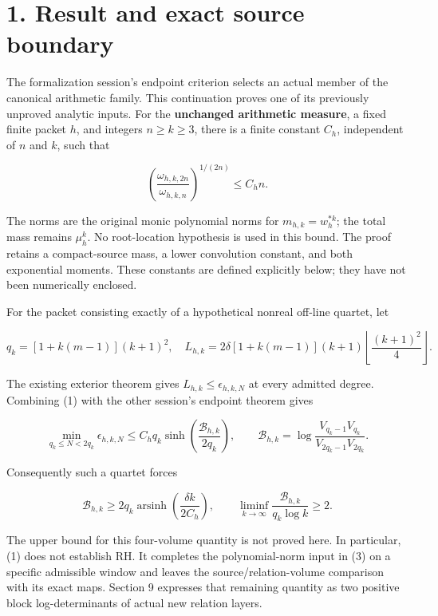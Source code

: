 


{
\setcounter{tocdepth}{3}

}
\section{1. Result and exact source
boundary}\label{GraphV2:result-and-exact-source-boundary}

The formalization session's endpoint criterion selects an actual member
of the canonical arithmetic family. This continuation proves one of its
previously unproved analytic inputs. For the \textbf{unchanged
arithmetic measure}, a fixed finite packet \(h\), and integers
\(n\ge k\ge3\), there is a finite constant \(C_h\), independent of \(n\)
and \(k\), such that

\[
 \boxed{\left(\frac{\omega_{h,k,2n}}{\omega_{h,k,n}}\right)^{1/(2n)}
       \le C_h n.}                                                    \tag{1}
\]

The norms are the original monic polynomial norms for
\(m_{h,k}=w_h^{*k}\); the total mass remains \(\mu_h^k\). No
root-location hypothesis is used in this bound. The proof retains a
compact-source mass, a lower convolution constant, and both exponential
moments. These constants are defined explicitly below; they have not
been numerically enclosed.

For the packet consisting exactly of a hypothetical nonreal off-line
quartet, let

\[
 q_k=[1+k(m-1)](k+1)^2,
 \quad
 L_{h,k}=2\delta[1+k(m-1)](k+1)
                 \left\lfloor\frac{(k+1)^2}{4}\right\rfloor.             \tag{2}
\]

The existing exterior theorem gives \(L_{h,k}\le\epsilon_{h,k,N}\) at
every admitted degree. Combining (1) with the other session's endpoint
theorem gives

\[
 \boxed{\min_{q_k\le N<2q_k}\epsilon_{h,k,N}
 \le C_hq_k\sinh\!\left(\frac{\mathcal B_{h,k}}{2q_k}\right),\qquad
 \mathcal B_{h,k}=\log\frac{V_{q_k-1}V_{q_k}}
                              {V_{2q_k-1}V_{2q_k}}.}                    \tag{3}
\]

Consequently such a quartet forces

\[
 \boxed{\mathcal B_{h,k}\ge
 2q_k\operatorname{arsinh}\!\left(\frac{\delta k}{2C_h}\right),\qquad
 \liminf_{k\to\infty}\frac{\mathcal B_{h,k}}{q_k\log k}\ge2.}           \tag{4}
\]

The upper bound for this four-volume quantity is not proved here. In
particular, (1) does not establish RH. It completes the polynomial-norm
input in (3) on a specific admissible window and leaves the
source/relation-volume comparison with its exact maps. Section 9
expresses that remaining quantity as two positive block log-determinants
of actual new relation layers.

